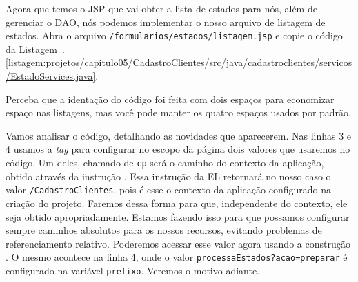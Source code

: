 Agora que temos o JSP que vai obter a lista de estados para nós, além de gerenciar o DAO, nós podemos implementar o nosso arquivo de listagem de estados. Abra o arquivo \texttt{/formularios/estados/listagem.jsp} e copie o código da Listagem~\thechapter.\ref{listagem:projetos/capitulo05/CadastroClientes/src/java/cadastroclientes/servicos/EstadoServices.java}.


Perceba que a identação do código foi feita com dois espaços para economizar espaço nas listagens, mas você pode manter os quatro espaços usados por padrão.

Vamos analisar o código, detalhando as novidades que aparecerem. Nas linhas 3 e 4 usamos a \textit{tag}  para configurar no escopo da página dois valores que usaremos no código. Um deles, chamado de \texttt{cp} será o caminho do contexto da aplicação, obtido através da instrução . Essa instrução da EL retornará no nosso caso o valor \texttt{/CadastroClientes}, pois é esse o contexto da aplicação configurado na criação do projeto. Faremos dessa forma para que, independente do contexto, ele seja obtido apropriadamente. Estamos fazendo isso para que possamos configurar sempre caminhos absolutos para os nossos recursos, evitando problemas de referenciamento relativo. Poderemos acessar esse valor agora usando a construção . O mesmo acontece na linha 4, onde o valor \texttt{processaEstados?acao=preparar} é configurado na variável \texttt{prefixo}. Veremos o motivo adiante.

